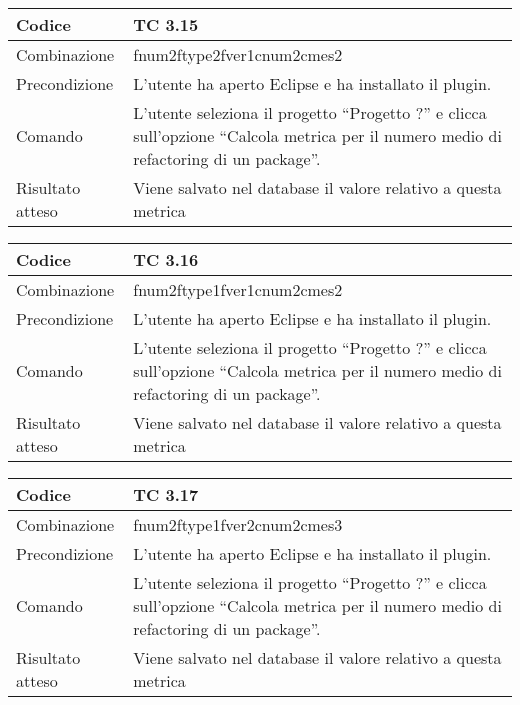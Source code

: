 \begin{table}[ht]
\begin{tabular}{|p{3cm}|p{9cm}|}
\hline
\cellcolor{lightgray}Codice				& TC 3.15								\\
\hline
\cellcolor{lightgray}Combinazione		& fnum2ftype2fver1cnum2cmes2  									\\
\hline
\cellcolor{lightgray}Precondizione		& L'utente ha aperto Eclipse e ha installato il plugin.			\\
\hline
\cellcolor{lightgray}Comando			& L'utente seleziona il progetto ``Progetto ?''  e clicca sull'opzione 
``Calcola metrica per il numero medio di refactoring di un package''.	\\
\hline
\cellcolor{lightgray}Risultato atteso	& Viene salvato nel database il valore relativo a questa metrica	\\
\hline
\end{tabular}
\end{table}

\begin{table}[ht]
\begin{tabular}{|p{3cm}|p{9cm}|}
\hline
\cellcolor{lightgray}Codice				& TC 3.16								\\
\hline
\cellcolor{lightgray}Combinazione		& fnum2ftype1fver1cnum2cmes2 									\\
\hline
\cellcolor{lightgray}Precondizione		& L'utente ha aperto Eclipse e ha installato il plugin.				\\
\hline
\cellcolor{lightgray}Comando			& L'utente seleziona il progetto ``Progetto ?''  e clicca sull'opzione ``Calcola metrica per il numero medio di refactoring di un package''.	\\
\hline
\cellcolor{lightgray}Risultato atteso	& Viene salvato nel database il valore relativo a questa metrica	\\
\hline
\end{tabular}
\end{table}

\begin{table}[ht]
\begin{tabular}{|p{3cm}|p{9cm}|}
\hline
\cellcolor{lightgray}Codice				& TC 3.17								\\
\hline
\cellcolor{lightgray}Combinazione		& fnum2ftype1fver2cnum2cmes3 								\\
\hline
\cellcolor{lightgray}Precondizione		& L'utente ha aperto Eclipse e ha installato il plugin.									\\
\hline
\cellcolor{lightgray}Comando			& L'utente seleziona il progetto ``Progetto ?''  e clicca sull'opzione ``Calcola metrica per il numero medio di refactoring di un package''.	\\
\hline
\cellcolor{lightgray}Risultato atteso	& Viene salvato nel database il valore relativo a questa metrica	\\
\hline
\end{tabular}
\end{table}


